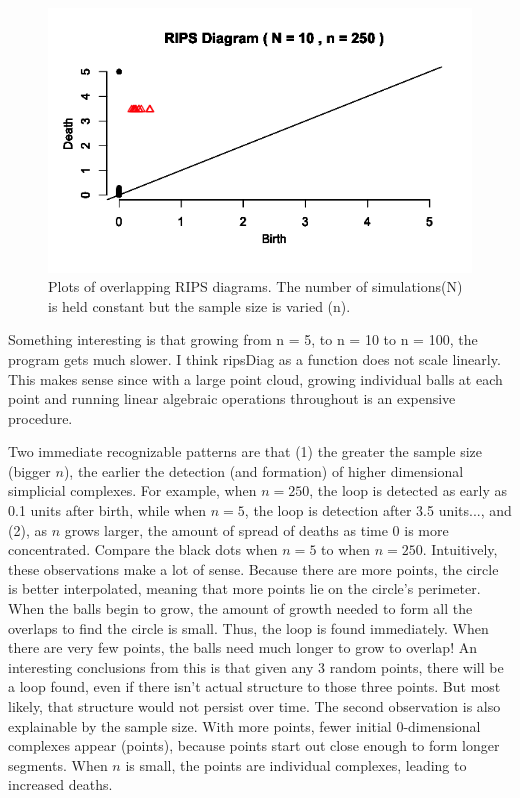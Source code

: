 \documentclass[a4paper]{article}
\begin{document}
\begin{figure}[!htb]
\endminipage\hfill
{}
  \includegraphics[width=\linewidth]{RIPS_n250.png}
\endminipage\hfill
\caption{Plots of overlapping RIPS diagrams. The number of simulations(N) is held constant but the sample size is varied (n).}
\end{figure}

\noindent Something interesting is that growing from n = 5, to n = 10 to n = 100, the program gets much slower. I think ripsDiag as a function does not scale linearly. This makes sense since with a large point cloud, growing individual balls at each point and running linear algebraic operations throughout is an expensive procedure. \newline

\noindent Two immediate recognizable patterns are that (1) the greater the sample size (bigger $n$), the earlier the detection (and formation) of higher dimensional simplicial complexes. For example, when $n = 250$, the loop is detected as early as 0.1 units after birth, while when $n = 5$, the loop is detection after 3.5 units..., and (2), as $n$ grows larger, the amount of spread of deaths as time 0 is more concentrated. Compare the black dots when $n = 5$ to when $n = 250$. Intuitively, these observations make a lot of sense. Because there are more points, the circle is better interpolated, meaning that more points lie on the circle's perimeter. When the balls begin to grow, the amount of growth needed to form all the overlaps to find the circle is small. Thus, the loop is found immediately. When there are very few points, the balls need much longer to grow to overlap! An interesting conclusions from this is that given any 3 random points, there will be a loop found, even if there isn't actual structure to those three points. But most likely, that structure would not persist over time. The second observation is also explainable by the sample size. With more points, fewer initial 0-dimensional complexes appear (points), because points start out close enough to form longer segments. When $n$ is small, the points are individual complexes, leading to increased deaths.
\end{document}
